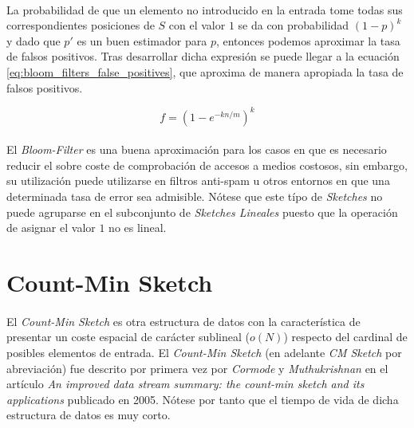 \documentclass{subfiles}
\begin{document}
      \paragraph{}
      La probabilidad de que un elemento no introducido en la entrada tome todas sus correspondientes posiciones de $S$ con el valor $1$ se da con probabilidad $(1-p)^k$ y dado que $p'$ es un buen estimador para $p$, entonces podemos aproximar la tasa de falsos positivos. Tras desarrollar dicha expresión se puede llegar a la ecuación \eqref{eq:bloom_filters_false_positives}, que aproxima de manera apropiada la tasa de falsos positivos.

      \begin{equation}
      \label{eq:bloom_filters_false_positives}
        f = (1-e^{-kn/m})^k
      \end{equation}

      \paragraph{}
      El \emph{Bloom-Filter} es una buena aproximación para los casos en que es necesario reducir el sobre coste de comprobación de accesos a medios costosos, sin embargo, su utilización puede utilizarse en filtros anti-spam u otros entornos en que una determinada tasa de error sea admisible. Nótese que este típo de \emph{Sketches} no puede agruparse en el subconjunto de \emph{Sketches Lineales} puesto que la operación de asignar el valor $1$ no es lineal.

    \section{Count-Min Sketch}
    \label{sec:count_min_sketch}

      \paragraph{}
      El \emph{Count-Min Sketch} es otra estructura de datos con la característica de presentar un coste espacial de carácter sublineal ($o(N)$) respecto del cardinal de posibles elementos de entrada. El \emph{Count-Min Sketch} (en adelante \emph{CM Sketch} por abreviación) fue descrito por primera vez por \emph{Cormode} y \emph{Muthukrishnan} en el artículo \emph{An improved data stream summary: the count-min sketch and its applications} \cite{cormode2005improved} publicado en 2005. Nótese por tanto que el tiempo de vida de dicha estructura de datos es muy corto.
\end{document}
